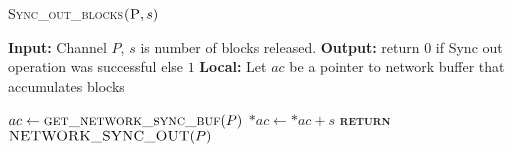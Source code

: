 \documentclass[10pt]{article}
\begin{document}
\begin{algorithm}{}
\footnotesize
\caption{\textsc{Sync\_out\_blocks}{$\textsc{(P}, s)$}}
\label{alg:Sync_out_blocks} 
\begin{algorithmic}[1]

\STATE \textbf{Input:} Channel $P$, $s$ is number of blocks released.
\STATE \textbf{Output:} return {$0$} if Sync out operation was successful else {$1$}
\STATE \textbf{Local:} Let $ac$ be a pointer to network buffer that accumulates blocks

\STATE \quad $\textbf{$ac$} \leftarrow  \textsc{get\_network\_sync\_buf}(P)$ 
\STATE \quad $\textbf{$*ac$} \leftarrow  \textbf{$*ac$} + s$ 
\STATE \textsc{\textbf{return}} {$\textsc{NETWORK\_SYNC\_OUT}(P)$}
\STATE


\end{algorithmic}
\end{algorithm}
\end{document}
